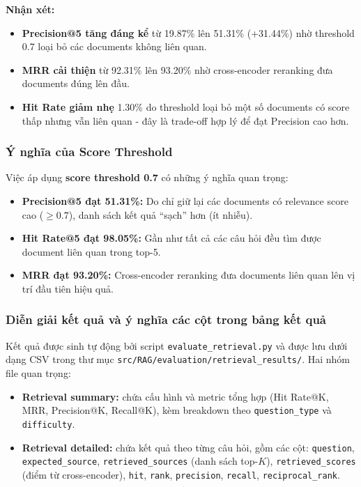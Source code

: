 \documentclass[../DoAn.tex]{subfiles}
\begin{document}
\textbf{Nhận xét:}
\begin{itemize}
    \item \textbf{Precision@5 tăng đáng kể} từ 19.87\% lên 51.31\% (+31.44\%) nhờ threshold 0.7 loại bỏ các documents không liên quan.
    \item \textbf{MRR cải thiện} từ 92.31\% lên 93.20\% nhờ cross-encoder reranking đưa documents đúng lên đầu.
    \item \textbf{Hit Rate giảm nhẹ} 1.30\% do threshold loại bỏ một số documents có score thấp nhưng vẫn liên quan - đây là trade-off hợp lý để đạt Precision cao hơn.
\end{itemize}

\subsubsection{Ý nghĩa của Score Threshold}

Việc áp dụng \textbf{score threshold 0.7} có những ý nghĩa quan trọng:

\begin{itemize}
    \item \textbf{Precision@5 đạt 51.31\%:} Do chỉ giữ lại các documents có relevance score cao ($\geq 0.7$), danh sách kết quả ``sạch'' hơn (ít nhiễu).
    \item \textbf{Hit Rate@5 đạt 98.05\%:} Gần như tất cả các câu hỏi đều tìm được document liên quan trong top-5.
    \item \textbf{MRR đạt 93.20\%:} Cross-encoder reranking đưa documents liên quan lên vị trí đầu tiên hiệu quả.
\end{itemize}

\subsubsection{Diễn giải kết quả và ý nghĩa các cột trong bảng kết quả}

Kết quả được sinh tự động bởi script \texttt{evaluate\_retrieval.py} và được lưu dưới dạng CSV trong thư mục \texttt{src/RAG/evaluation/retrieval\_results/}. Hai nhóm file quan trọng:
\begin{itemize}
    \item \textbf{Retrieval summary:} chứa cấu hình và metric tổng hợp (Hit Rate@K, MRR, Precision@K, Recall@K), kèm breakdown theo \texttt{question\_type} và \texttt{difficulty}.
    \item \textbf{Retrieval detailed:} chứa kết quả theo từng câu hỏi, gồm các cột: \texttt{question}, \texttt{expected\_source}, \texttt{retrieved\_sources} (danh sách top-$K$), \texttt{retrieved\_scores} (điểm từ cross-encoder), \texttt{hit}, \texttt{rank}, \texttt{precision}, \texttt{recall}, \texttt{reciprocal\_rank}.
\end{itemize}
\end{document}
